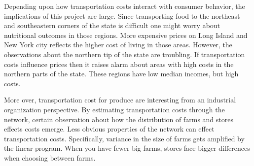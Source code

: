 \documentclass{report}
\begin{document}
Depending upon how transportation costs interact with consumer behavior, the implications of this project are large. Since transporting food to the northeast and southeastern corners of the state is difficult one might worry about nutritional outcomes in those regions. More expensive prices on Long Island and New York city reflects the higher cost of living in those areas. However, the observations about the northern tip of the state are troubling. If transportation costs influence prices then it raises alarm about areas with high costs in the northern parts of the state. These regions have low median incomes, but high costs.

More over, transportation cost for produce are interesting from an industrial organization perspective. By estimating transportation costs through the network, certain observation about how the distribution of farms and stores effects costs emerge. Less obvious properties of the network can effect transportation costs. Specifically, variance in the size of farms gets amplified by the linear program. When you have fewer big farms, stores face bigger differences when choosing between farms.


\pagebreak
\end{document}
